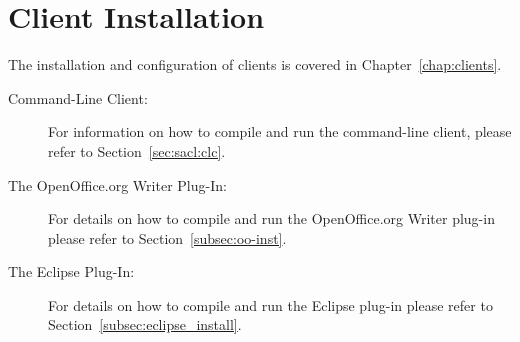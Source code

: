 \section{Client Installation}
The installation and configuration of clients is covered in
Chapter~\ref{chap:clients}.

\begin{description}
\item[Command-Line Client:] For information on how to compile and run
  the command-line client, please refer to Section~\ref{sec:sacl:clc}.

\item[The OpenOffice.org Writer Plug-In:] For details on how to
  compile and run the OpenOffice.org Writer plug-in please refer to
  Section~\ref{subsec:oo-inst}.

\item[The Eclipse Plug-In:] For details on how to
  compile and run the Eclipse plug-in please refer to
  Section~\ref{subsec:eclipse_install}.
\end{description}









